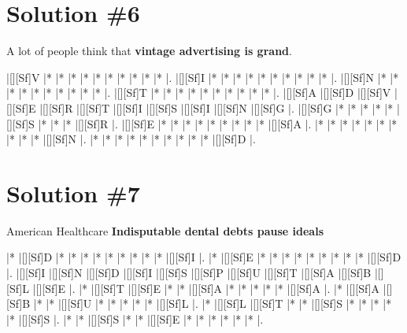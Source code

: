 \documentclass[letterpaper]{article}
\begin{document}
\newpage
\section*{Solution \#6}
A lot of people think that \textbf{vintage advertising is grand}.

\vspace*{0.5cm}
\begin{Puzzle}{11}{9}
|[][Sf]V  |*        |*        |*        |*        |*        |*        |*        |*        |*        |*        |. 
|[][Sf]I  |*        |*        |*        |*        |*        |*        |*        |*        |*        |*        |.  
|[][Sf]N  |*        |*        |*        |*        |*        |*        |*        |*        |*        |*        |.
|[][Sf]T  |*        |*        |*        |*        |*        |*        |*        |*        |*        |*        |.  
|[][Sf]A  |[][Sf]D  |[][Sf]V  |[][Sf]E  |[][Sf]R  |[][Sf]T  |[][Sf]I  |[][Sf]S  |[][Sf]I  |[][Sf]N  |[][Sf]G  |.
|[][Sf]G  |*        |*        |*        |*        |*        |[][Sf]S  |*        |*        |*        |[][Sf]R  |. 
|[][Sf]E  |*        |*        |*        |*        |*        |*        |*        |*        |*        |[][Sf]A  |.
|*        |*        |*        |*        |*        |*        |*        |*        |*        |*        |[][Sf]N  |.
|*        |*        |*        |*        |*        |*        |*        |*        |*        |*        |[][Sf]D  |.
\end{Puzzle}

\newpage
\section*{Solution \#7}
American Healthcare
\newline\textbf{Indisputable dental debts pause ideals}

\vspace*{0.5cm}
\begin{Puzzle}{12}{7}
|*        |[][Sf]D  |*        |*        |*        |*        |*        |*        |*        |*        |*        |[][Sf]I  |.
|*        |[][Sf]E  |*        |*        |*        |*        |*        |*        |*        |*        |*        |[][Sf]D  |.  
|[][Sf]I  |[][Sf]N  |[][Sf]D  |[][Sf]I  |[][Sf]S  |[][Sf]P  |[][Sf]U  |[][Sf]T  |[][Sf]A  |[][Sf]B  |[][Sf]L  |[][Sf]E  |.
|*        |[][Sf]T  |[][Sf]E  |*        |*        |[][Sf]A  |*        |*        |*        |*        |*        |[][Sf]A  |. 
|*        |[][Sf]A  |[][Sf]B  |*        |*        |[][Sf]U  |*        |*        |*        |*        |*        |[][Sf]L  |.
|*        |[][Sf]L  |[][Sf]T  |*        |*        |[][Sf]S  |*        |*        |*        |*        |*        |[][Sf]S  |.
|*        |*        |[][Sf]S  |*        |*        |[][Sf]E  |*        |*        |*        |*        |*        |*        |.
\end{Puzzle}
\end{document}
